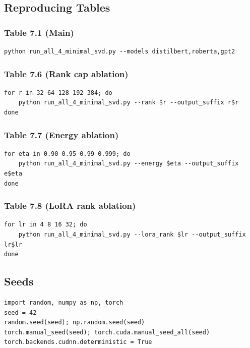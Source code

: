 \subsection{Reproducing Tables}

\subsubsection{Table 7.1 (Main)}
\begin{lstlisting}
python run_all_4_minimal_svd.py --models distilbert,roberta,gpt2
\end{lstlisting}

\subsubsection{Table 7.6 (Rank cap ablation)}
\begin{lstlisting}
for r in 32 64 128 192 384; do
    python run_all_4_minimal_svd.py --rank $r --output_suffix r$r
done
\end{lstlisting}

\subsubsection{Table 7.7 (Energy ablation)}
\begin{lstlisting}
for eta in 0.90 0.95 0.99 0.999; do
    python run_all_4_minimal_svd.py --energy $eta --output_suffix e$eta
done
\end{lstlisting}

\subsubsection{Table 7.8 (LoRA rank ablation)}
\begin{lstlisting}
for lr in 4 8 16 32; do
    python run_all_4_minimal_svd.py --lora_rank $lr --output_suffix lr$lr
done
\end{lstlisting}

\subsection{Seeds}

\begin{lstlisting}
import random, numpy as np, torch
seed = 42
random.seed(seed); np.random.seed(seed)
torch.manual_seed(seed); torch.cuda.manual_seed_all(seed)
torch.backends.cudnn.deterministic = True
\end{lstlisting}

